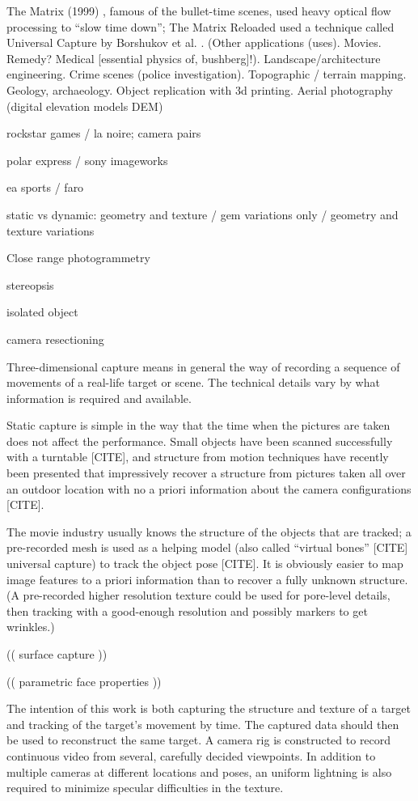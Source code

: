 The Matrix (1999) \cite{wachowski99matrix}, famous of the bullet-time scenes, used heavy optical flow processing to ``slow time down''; The Matrix Reloaded \cite{wachowski03reloaded} used a technique called Universal Capture by Borshukov et al. \cite{borshukov05universal}.
(Other applications (uses). Movies. Remedy? Medical [essential physics of, bushberg]!). Landscape/architecture engineering. Crime scenes (police investigation). Topographic / terrain mapping. Geology, archaeology. Object replication with 3d printing. Aerial photography (digital elevation models DEM)

rockstar games / la noire; camera pairs

polar express / sony imageworks

ea sports / faro


static vs dynamic: geometry and texture / gem variations only / geometry and texture variations

Close range photogrammetry

stereopsis

isolated object

camera resectioning

Three-dimensional capture means in general the way of recording a sequence of movements of a real-life target or scene.
The technical details vary by what information is required and available.

Static capture is simple in the way that the time when the pictures are taken does not affect the performance.
Small objects have been scanned successfully with a turntable [CITE], and structure from motion techniques have recently been presented that impressively recover a structure from pictures taken all over an outdoor location with no a priori information about the camera configurations [CITE].

The movie industry usually knows the structure of the objects that are tracked; a pre-recorded mesh is used as a helping model (also called ``virtual bones'' [CITE] universal capture) to track the object pose [CITE].
It is obviously easier to map image features to a priori information than to recover a fully unknown structure.
(A pre-recorded higher resolution texture could be used for pore-level details, then tracking with a good-enough resolution and possibly markers to get wrinkles.)

(( surface capture ))

(( parametric face properties ))

The intention of this work is both capturing the structure and texture of a target and tracking of the target's movement by time.
The captured data should then be used to reconstruct the same target.
A camera rig is constructed to record continuous video from several, carefully decided viewpoints.
In addition to multiple cameras at different locations and poses, an uniform lightning is also required to minimize specular difficulties in the texture.

